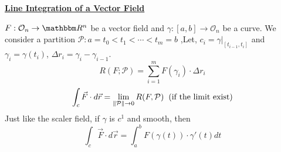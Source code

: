 \documentclass[Analysis-3]{subfiles}
\begin{document}
\begin{center}
    \large \underline{\textbf{Line Integration of a Vector Field} }
\end{center}

$F:\mathcal{O}_n \to \R^n$ be a vector field and $\gamma:[a,b] \to \mathcal{O}_n$ be a curve. We consider a partition $\mathcal{P}: a =t_0<t_1<\cdots < t_m=b$ ,Let, $c_i = \gamma|_{[t_{i-1},t_i]}$ and $\gamma_i = \gamma(t_i)$, $\Delta r_i = \gamma_{i} - \gamma_{i-1}$.
\[R(F;\mathcal{P})= \sum_{i=1}^m F(\gamma_i)\cdot \Delta r_i\]
\[\int_c \vec{F}\cdot d\vec{r} = \lim_{\norm{\mathcal{P}}\to 0} R(F,\mathcal{P}) \hspace{0.2cm}(\text{if the limit exist})\]
Just like the scaler field, if $\gamma$ is $c^1$ and smooth, then 
\[\int_c \vec{F}\cdot d\vec{r} = \int_a^b F(\gamma(t))\cdot \gamma'(t) dt \label{eq:3}\]
\end{document}
